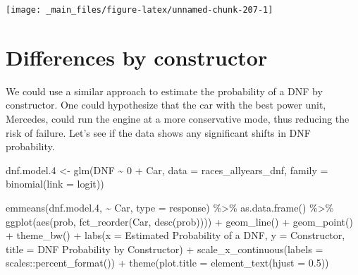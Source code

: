 \documentclass[
]{book}
\newenvironment{Shaded}{\begin{snugshade}}{\end{snugshade}}
\newcommand{\AttributeTok}[1]{\textcolor[rgb]{0.77,0.63,0.00}{#1}}
\newcommand{\DecValTok}[1]{\textcolor[rgb]{0.00,0.00,0.81}{#1}}
\newcommand{\FloatTok}[1]{\textcolor[rgb]{0.00,0.00,0.81}{#1}}
\newcommand{\FunctionTok}[1]{\textcolor[rgb]{0.00,0.00,0.00}{#1}}
\newcommand{\NormalTok}[1]{#1}
\newcommand{\OtherTok}[1]{\textcolor[rgb]{0.56,0.35,0.01}{#1}}
\newcommand{\SpecialCharTok}[1]{\textcolor[rgb]{0.00,0.00,0.00}{#1}}
\newcommand{\StringTok}[1]{\textcolor[rgb]{0.31,0.60,0.02}{#1}}
\begin{document}
\begin{center}\texttt{[image: \_main\_files/figure-latex/unnamed-chunk-207-1]} \end{center}

\hypertarget{differences-by-constructor}{%
\section{Differences by constructor}\label{differences-by-constructor}}

We could use a similar approach to estimate the probability of a DNF by constructor. One could hypothesize that the car with the best power unit, Mercedes, could run the engine at a more conservative mode, thus reducing the risk of failure. Let's see if the data shows any significant shifts in DNF probability.

\begin{Shaded}
\begin{Highlighting}[]
\NormalTok{dnf.model}\FloatTok{.4} \OtherTok{\textless{}{-}} \FunctionTok{glm}\NormalTok{(DNF }\SpecialCharTok{\textasciitilde{}} \DecValTok{0} \SpecialCharTok{+}\NormalTok{ Car, }\AttributeTok{data =}\NormalTok{ races\_allyears\_dnf,}
                   \AttributeTok{family =} \FunctionTok{binomial}\NormalTok{(}\AttributeTok{link =} \StringTok{\textquotesingle{}logit\textquotesingle{}}\NormalTok{))}
\end{Highlighting}
\end{Shaded}

\begin{Shaded}
\begin{Highlighting}[]
\FunctionTok{emmeans}\NormalTok{(dnf.model}\FloatTok{.4}\NormalTok{, }\SpecialCharTok{\textasciitilde{}}\NormalTok{ Car, }\AttributeTok{type =} \StringTok{\textquotesingle{}response\textquotesingle{}}\NormalTok{) }\SpecialCharTok{\%\textgreater{}\%} 
  \FunctionTok{as.data.frame}\NormalTok{() }\SpecialCharTok{\%\textgreater{}\%} 
  \FunctionTok{ggplot}\NormalTok{(}\FunctionTok{aes}\NormalTok{(prob, }\FunctionTok{fct\_reorder}\NormalTok{(Car, }\FunctionTok{desc}\NormalTok{(prob)))) }\SpecialCharTok{+}
  \FunctionTok{geom\_line}\NormalTok{() }\SpecialCharTok{+}
  \FunctionTok{geom\_point}\NormalTok{() }\SpecialCharTok{+} 
  \FunctionTok{theme\_bw}\NormalTok{() }\SpecialCharTok{+}
  \FunctionTok{labs}\NormalTok{(}\AttributeTok{x =} \StringTok{\textquotesingle{}Estimated Probability of a DNF\textquotesingle{}}\NormalTok{,}
       \AttributeTok{y =} \StringTok{\textquotesingle{}Constructor\textquotesingle{}}\NormalTok{,}
       \AttributeTok{title =} \StringTok{\textquotesingle{}DNF Probability by Constructor\textquotesingle{}}\NormalTok{) }\SpecialCharTok{+}
\FunctionTok{scale\_x\_continuous}\NormalTok{(}\AttributeTok{labels =}\NormalTok{ scales}\SpecialCharTok{::}\FunctionTok{percent\_format}\NormalTok{()) }\SpecialCharTok{+}
  \FunctionTok{theme}\NormalTok{(}\AttributeTok{plot.title =} \FunctionTok{element\_text}\NormalTok{(}\AttributeTok{hjust =} \FloatTok{0.5}\NormalTok{))}
\end{Highlighting}
\end{Shaded}
\end{document}
